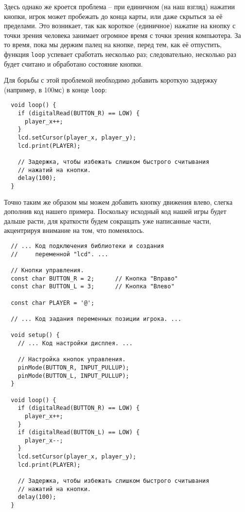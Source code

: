 \documentclass[../sparc.tex]{subfiles}
\begin{document}
Здесь однако же кроется проблема -- при единичном (на наш взгляд) нажатии
кнопки, игрок может пробежать до конца карты, или даже скрыться за её пределами.
Это возникает, так как короткое (единичное) нажатие на кнопку с точки зрения
человека занимает огромное время с точки зрения компьютера.  За то время, пока
мы держим палец на кнопке, перед тем, как её отпустить, функция \texttt{loop}
успевает сработать несколько раз; следовательно, несколько раз будет считано и обработано состояние кнопки.

Для борьбы с этой проблемой необходимо добавить короткую задержку (например, в
100мс) в конце \texttt{loop}:

\begin{verbatim}
  void loop() {
    if (digitalRead(BUTTON_R) == LOW) {
      player_x++;
    }
    lcd.setCursor(player_x, player_y);
    lcd.print(PLAYER);

    // Задержка, чтобы избежать слишком быстрого считывания
    // нажатий на кнопки.
    delay(100);
  }
\end{verbatim}


Точно таким же образом мы можем добавить кнопку движения влево, слегка дополнив
код нашего примера.  Поскольку исходный код нашей игры будет дальше расти, для
краткости будем сокращать уже написанные части, акцентрируя внимание на том, что
поменялось.

\begin{verbatim}
  // ... Код подключения библиотеки и создания
  //     переменной "lcd". ...

  // Кнопки управления.
  const char BUTTON_R = 2;      // Кнопка "Вправо"
  const char BUTTON_L = 3;      // Кнопка "Влево"

  const char PLAYER = '@';

  // ... Код задания переменных позиции игрока. ...

  void setup() {
    // ... Код настройки дисплея. ...

    // Настройка кнопок управления.
    pinMode(BUTTON_R, INPUT_PULLUP);
    pinMode(BUTTON_L, INPUT_PULLUP);
  }

  void loop() {
    if (digitalRead(BUTTON_R) == LOW) {
      player_x++;
    }
    if (digitalRead(BUTTON_L) == LOW) {
      player_x--;
    }
    lcd.setCursor(player_x, player_y);
    lcd.print(PLAYER);

    // Задержка, чтобы избежать слишком быстрого считывания
    // нажатий на кнопки.
    delay(100);
  }
\end{verbatim}
\end{document}
